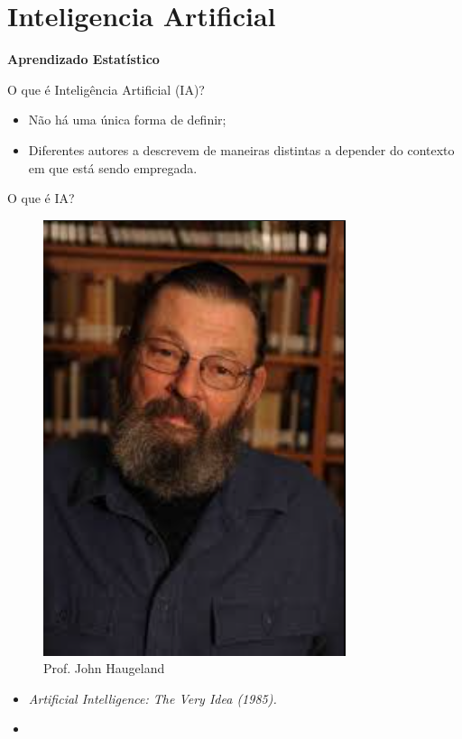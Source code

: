 \section{Inteligencia Artificial}
\begin{frame}[plain] %
	\centering
	\vfill
	\textbf{\Huge Aprendizado Estatístico}
	\vfill
\end{frame}

\begin{frame}{O que é Inteligência Artificial (IA)?}
    \begin{block}{}
        \begin{itemize}
            \item Não há uma única forma de definir; 
            \item Diferentes autores a descrevem de maneiras distintas a depender do contexto em que está sendo empregada.
        \end{itemize}
    \end{block}
\end{frame}
\begin{frame}{O que é IA?}
    \begin{minipage}{0.5\linewidth}
        \begin{figure}
            \centering
            \includegraphics[width=0.6\linewidth]{imagens//secao1/haugeland1985.png}
            \caption{Prof. John Haugeland}
        \end{figure}
    \end{minipage}
    \begin{minipage}{0.5\linewidth}
        \begin{itemize}
        \justifying
            \item \textit{Artificial Intelligence: The Very Idea (1985).}
            \item {}
        \end{itemize}
    \end{minipage}
\end{frame}

